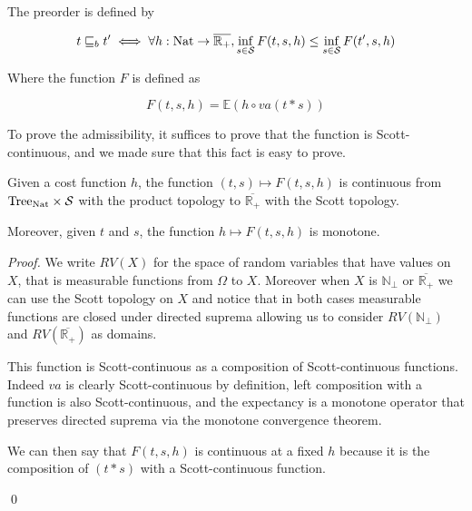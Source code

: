 \begin{definition}[Preorder]
    The preorder is defined by

    \begin{equation*}
        t \sqsubseteq_b t' \iff \forall h : \textnormal{Nat} \to \overline{\mathbb{R}_+}, 
        \inf_{ s \in \mathcal{S}} F (t,s,h) \leq \inf_{s \in \mathcal{S}} F (t',s,h)
    \end{equation*}

    Where the function $F$ is defined as 

    \begin{equation*}
        F(t,s,h) = \mathbb{E}(h \circ va(t * s))
    \end{equation*}
\end{definition}

To prove the admissibility, it suffices to prove that the function 
is Scott-continuous, and we made sure that this fact is easy to prove.

\begin{lemma}
    Given a cost function $h$, the function 
    $(t,s) \mapsto F(t,s,h)$ is continuous from $\textnormal{Tree}_{\textnormal{Nat}} \times
    \mathcal{S}$ with the product topology to $\overline{\mathbb{R}_+}$ with the 
    Scott topology.

    Moreover, given $t$ and $s$, the function $h \mapsto F(t,s,h)$ is monotone.
\end{lemma}

\begin{proof}
    We write $RV(X)$ for the space of random variables 
    that have values on $X$, that is measurable 
    functions from $\Omega$ to $X$. Moreover when 
    $X$ is $\mathbb{N}_\bot$ or $\overline{\mathbb{R}_+}$
    we can use the Scott topology on $X$ and notice that in both cases 
    measurable functions are closed under directed suprema 
    allowing us to consider $RV(\mathbb{N}_\bot)$ and $RV(\overline{\mathbb{R}_+})$ as 
    domains.

    \begin{center}
    \end{center}

    This function is Scott-continuous as a composition of 
    Scott-continuous functions. Indeed $va$ is clearly Scott-continuous 
    by definition, left composition with a function is also
    Scott-continuous, and the expectancy is a monotone operator 
    that preserves directed suprema via the monotone convergence theorem. 

    We can then say that $F(t,s,h)$ is continuous at a fixed $h$
    because it is the composition of $(t*s)$ with a Scott-continuous 
    function.

    \qed
\end{proof}

